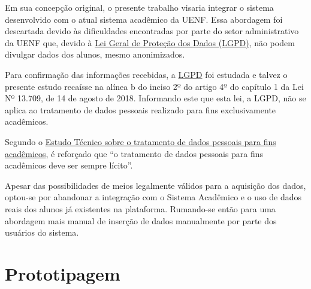 Em sua concepção original, o presente trabalho visaria integrar o sistema desenvolvido com o atual sistema acadêmico da UENF. Essa abordagem foi descartada devido às dificuldades encontradas por parte do setor administrativo da UENF que, devido à \href{https://www.planalto.gov.br/ccivil_03/_ato2015-2018/2018/lei/l13709.htm}{Lei Geral de Proteção dos Dados (LGPD)}, não podem divulgar dados dos alunos, mesmo anonimizados.

Para confirmação das informações recebidas, a \href{https://www.planalto.gov.br/ccivil_03/_ato2015-2018/2018/lei/l13709.htm}{LGPD} foi estudada e talvez o presente estudo recaísse na alínea b do inciso 2º do artigo 4º do capítulo 1 da Lei Nº 13.709, de 14 de agosto de 2018. Informando este que esta lei, a LGPD, não se aplica ao tratamento de dados pessoais realizado para fins exclusivamente acadêmicos.

Segundo o \href{https://www.gov.br/anpd/pt-br/assuntos/noticias/sei_00261-000810_2022_17.pdf}{Estudo Técnico sobre o tratamento de dados pessoais para fins acadêmicos}, é reforçado que ``o tratamento de dados pessoais para fins acadêmicos deve ser sempre lícito''.

Apesar das possibilidades de meios legalmente válidos para a aquisição dos dados, optou-se por abandonar a integração com o Sistema Acadêmico e o uso de dados reais dos alunos já existentes na plataforma. Rumando-se então para uma abordagem mais manual de inserção de dados manualmente por parte dos usuários do sistema.

\section{Prototipagem} %

